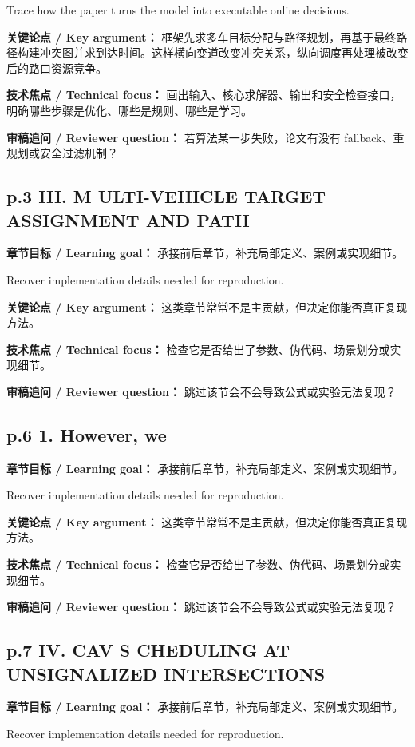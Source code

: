 \documentclass[UTF8,a4paper,11pt,fontset=fandol]{ctexart}
\begin{document}
Trace how the paper turns the model into executable online decisions.

\textbf{关键论点 / Key argument：} 框架先求多车目标分配与路径规划，再基于最终路径构建冲突图并求到达时间。这样横向变道改变冲突关系，纵向调度再处理被改变后的路口资源竞争。

\textbf{技术焦点 / Technical focus：} 画出输入、核心求解器、输出和安全检查接口，明确哪些步骤是优化、哪些是规则、哪些是学习。

\textbf{审稿追问 / Reviewer question：} 若算法某一步失败，论文有没有 fallback、重规划或安全过滤机制？

\subsection*{p.3 III. M ULTI-VEHICLE TARGET ASSIGNMENT AND PATH}
\textbf{章节目标 / Learning goal：} 承接前后章节，补充局部定义、案例或实现细节。

Recover implementation details needed for reproduction.

\textbf{关键论点 / Key argument：} 这类章节常常不是主贡献，但决定你能否真正复现方法。

\textbf{技术焦点 / Technical focus：} 检查它是否给出了参数、伪代码、场景划分或实现细节。

\textbf{审稿追问 / Reviewer question：} 跳过该节会不会导致公式或实验无法复现？

\subsection*{p.6 1. However, we}
\textbf{章节目标 / Learning goal：} 承接前后章节，补充局部定义、案例或实现细节。

Recover implementation details needed for reproduction.

\textbf{关键论点 / Key argument：} 这类章节常常不是主贡献，但决定你能否真正复现方法。

\textbf{技术焦点 / Technical focus：} 检查它是否给出了参数、伪代码、场景划分或实现细节。

\textbf{审稿追问 / Reviewer question：} 跳过该节会不会导致公式或实验无法复现？

\subsection*{p.7 IV. CAV S CHEDULING AT UNSIGNALIZED INTERSECTIONS}
\textbf{章节目标 / Learning goal：} 承接前后章节，补充局部定义、案例或实现细节。

Recover implementation details needed for reproduction.
\end{document}
